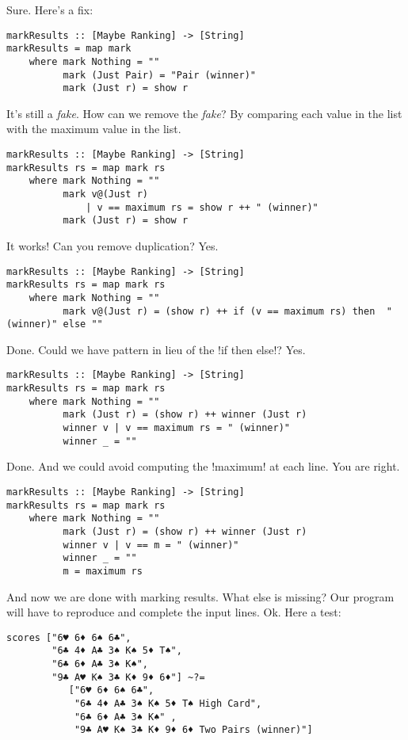 \lhA \error Sure. Here's a fix:
\begin{lstlisting}[frame=single]
markResults :: [Maybe Ranking] -> [String]
markResults = map mark
    where mark Nothing = ""
          mark (Just Pair) = "Pair (winner)"
          mark (Just r) = show r
\end{lstlisting}
\success It's still a \emph{fake}.
\lhN How can we remove the \emph{fake}?
\lhA By comparing each value in the list with the maximum value in the list.
\begin{lstlisting}[frame=single]
markResults :: [Maybe Ranking] -> [String]
markResults rs = map mark rs
    where mark Nothing = ""
          mark v@(Just r) 
              | v == maximum rs = show r ++ " (winner)" 
          mark (Just r) = show r 
\end{lstlisting}
\success It works!
\lhN Can you remove duplication?
\lhA Yes.
\begin{lstlisting}[frame=single]
markResults :: [Maybe Ranking] -> [String]
markResults rs = map mark rs
    where mark Nothing = ""
          mark v@(Just r) = (show r) ++ if (v == maximum rs) then  " (winner)" else ""
\end{lstlisting}
\success Done.
\lhN Could we have pattern in lieu of the \il!if then else!?
\lhA Yes.
\begin{lstlisting}[frame=single]
markResults :: [Maybe Ranking] -> [String]
markResults rs = map mark rs
    where mark Nothing = ""
          mark (Just r) = (show r) ++ winner (Just r)
          winner v | v == maximum rs = " (winner)"
          winner _ = ""
\end{lstlisting}
\success Done.
\lhN And we could avoid computing the \il!maximum! at each line.
\lhA You are right.
\begin{lstlisting}[frame=single]
markResults :: [Maybe Ranking] -> [String]
markResults rs = map mark rs
    where mark Nothing = ""
          mark (Just r) = (show r) ++ winner (Just r)
          winner v | v == m = " (winner)"
          winner _ = ""
          m = maximum rs
\end{lstlisting}
\success And now we are done with marking results.
\lhN What else is missing?
\lhA Our program will have to reproduce and complete the input lines.
\lhN Ok. Here a test:
\begin{lstlisting}[frame=single]
scores ["6♥ 6♦ 6♠ 6♣",
        "6♣ 4♦ A♣ 3♠ K♠ 5♦ T♠",
        "6♣ 6♦ A♣ 3♠ K♠",
        "9♣ A♥ K♠ 3♣ K♦ 9♦ 6♦"] ~?= 
           ["6♥ 6♦ 6♠ 6♣",
            "6♣ 4♦ A♣ 3♠ K♠ 5♦ T♠ High Card",
            "6♣ 6♦ A♣ 3♠ K♠" ,
            "9♣ A♥ K♠ 3♣ K♦ 9♦ 6♦ Two Pairs (winner)"]
\end{lstlisting}
